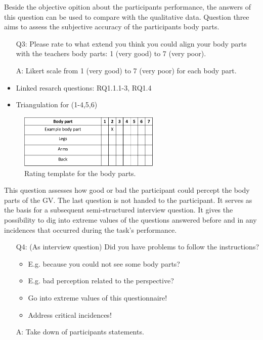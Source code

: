 Beside the objective opition about the participants performance, the answers of this question can be used to compare with the qualitative data. Question three aims to assess the subjective accuracy of the participants body parts.
\begin{itemize}
	\item[Q3:] Please rate to what extend you think you could align your body parts with the teachers body parts: 1 (very good) to 7 (very poor). 
	\item[A:] Likert scale from 1 (very good) to 7 (very poor) for each body part.
	\item Linked resarch questions: RQ1.1.1-3, RQ1.4
	\item Triangulation for (1-4,5,6)
\end{itemize} 
\begin{figure}[H]
	\centering
	\includegraphics[width=0.6\textwidth]{figures/body-parts-acc.png}
	\caption[Rating template for the body parts]{Rating template for the body parts.}
	\label{fig:bodypartsacc}
\end{figure}
This question assesses how good or bad the participant could percept the body parts of the GV. The last question is not handed to the participant. It serves as the basis for a subsequent semi-structured interview question. It gives the possibility to dig into extreme values of the questions answered before and in any incidences that occurred during the task's performance.
\begin{itemize}
	\item[Q4:] (As interview question) Did you have problems to follow the instructions? 
	\begin{itemize}
		\item E.g. because you could not see some body parts?
		\item E.g. bad perception related to the perspective?
		\item Go into extreme values of this questionnaire! 
		\item Address critical incidences!
	\end{itemize}
	\item[A:] Take down of participants statements.
\end{itemize}


